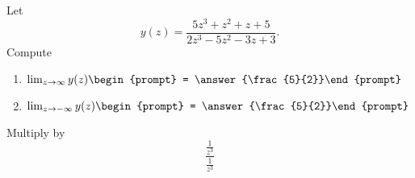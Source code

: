\documentclass{ximera}
\author{Bart Snapp}
\begin{document}
\begin{exercise}
Let 
\[
y(z) = \frac{5 z^3+z^2+z+5}{2 z^3-5 z^2-3 z+3}.
\]
Compute
\begin{enumerate}
\item $\lim_{z\to \infty} y(z) \begin{prompt} = \answer{\frac{5}{2}}\end{prompt}$
\item $\lim_{z\to -\infty}y(z) \begin{prompt} = \answer{\frac{5}{2}}\end{prompt}$
\end{enumerate}
\begin{hint}
Multiply by
\[
\frac{\frac{1}{z^3}}{\frac{1}{z^3}}
\]
\end{hint}
\end{exercise}
\end{document}
